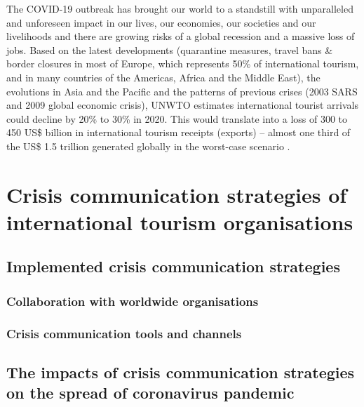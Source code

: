 \documentclass[draft=false
              ,paper=a4
              ,twoside=false
              ,fontsize=12pt
              ,headsepline
              ,BCOR10mm
              ,DIV11
              ]{scrbook}
\begin{document}
The COVID-19 outbreak has brought our world to a standstill with unparalleled and unforeseen impact in our lives, our economies, our societies and our livelihoods and there are growing risks of a global recession and a massive loss of jobs. Based on the latest developments (quarantine measures, travel bans \& border closures in most of Europe, which represents 50\% of international tourism, and in many countries of the Americas, Africa and the Middle East), the evolutions in Asia and the Pacific and the patterns of previous crises (2003 SARS and 2009 global economic crisis), UNWTO estimates international tourist arrivals could decline by 20\% to 30\% in 2020.  This would translate into a loss of 300 to 450 US\$ billion in international tourism receipts (exports) – almost one third of the US\$ 1.5 trillion generated globally in the worst-case scenario \cite{unwto}.

\vspace{12pt}
\chapter{Crisis communication strategies of international tourism organisations}
\vspace{6pt}
\section{Implemented crisis communication strategies}
\vspace{6pt}
\subsection{Collaboration with worldwide organisations}
\vspace{6pt}

\vspace{12pt}
\subsection{Crisis communication tools and channels}
\vspace{6pt}

\vspace{12pt}
\section{The impacts of crisis communication strategies on the spread of coronavirus pandemic}
\vspace{6pt}
\end{document}
